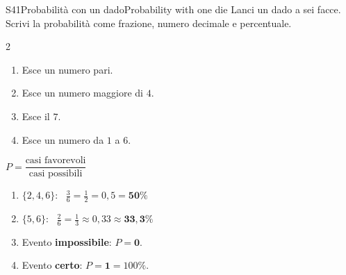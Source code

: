 \begin{esercizio}{S4}{1}{Probabilità con un dado}{Probability with one die}
Lanci un dado a sei facce. Scrivi la probabilità come frazione, numero decimale e percentuale.
\begin{multicols}{2}
\begin{enumerate}
\item Esce un numero pari. 
\item Esce un numero maggiore di $4$. 
\item Esce il $7$. 
\item Esce un numero da $1$ a $6$. 
\end{enumerate}
\end{multicols}
\end{esercizio}
\begin{solbox}
$P=\dfrac{\text{casi favorevoli}}{\text{casi possibili}}$
\begin{enumerate}
\item $\{2,4,6\}$: \ $\frac36=\frac12=0,5=\mathbf{50\%}$
\item $\{5,6\}$: \ $\frac26=\frac13\approx0,33\approx\mathbf{33,3\%}$
\item Evento \textbf{impossibile}: $P=\mathbf{0}$.
\item Evento \textbf{certo}: $P=\mathbf{1}=100\%$.
\end{enumerate}
\end{solbox}

